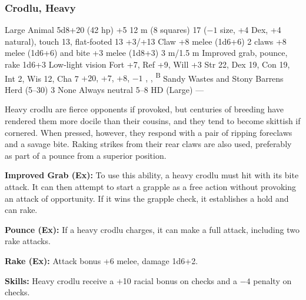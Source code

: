 \subsubsection{Crodlu, Heavy}
\begin{MonsterStats}
{Large Animal}
{5d8+20 (42 hp)}
{+5}
{12 m (8 squares)}
{17 ($-1$ size, +4 Dex, +4 natural), touch 13, flat-footed 13}
{+3/+13}
{Claw +8 melee (1d6+6)}
{2 claws +8 melee (1d6+6) and bite +3 melee (1d8+3)}
{3 m/1.5 m}
{Improved grab, pounce, rake 1d6+3}
{Low-light vision}
{Fort +7, Ref +9, Will +3}
{Str 22, Dex 19, Con 19, Int 2, Wis 12, Cha 7}
{ +20,  +7,  +8,  $-1$}
{, , \textsuperscript{B}}
{Sandy Wastes and Stony Barrens}
{Herd (5--30)}
{3}
{None}
{Always neutral}
{5--8 HD (Large)}
{---}
\end{MonsterStats}


Heavy crodlu are fierce opponents if provoked, but centuries of breeding have rendered them more docile than their cousins, and they tend to become skittish if cornered. When pressed, however, they respond with a pair of ripping foreclaws and a savage bite. Raking strikes from their rear claws are also used, preferably as part of a pounce from a superior position.

\textbf{Improved Grab (Ex):} To use this ability, a heavy crodlu must hit with its bite attack. It can then attempt to start a grapple as a free action without provoking an attack of opportunity. If it wins the grapple check, it establishes a hold and can rake.

\textbf{Pounce (Ex):} If a heavy crodlu charges, it can make a full attack, including two rake attacks.

\textbf{Rake (Ex):} Attack bonus +6 melee, damage 1d6+2.

\textbf{Skills:} Heavy crodlu receive a +10 racial bonus on  checks and a $-4$ penalty on  checks.
